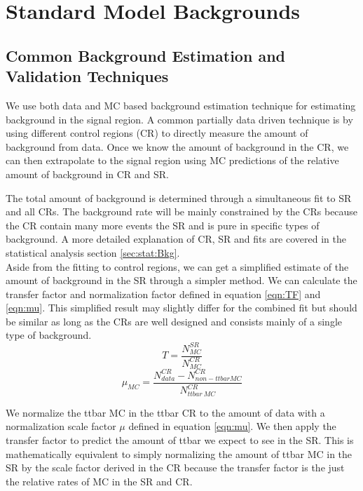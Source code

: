 \chapter{Standard Model Backgrounds}
\label{chap:backgrounds}

\section{Common Background Estimation and Validation Techniques}
\label{sec:Bkg:Tech}

\indent We use both data and MC based background estimation technique for estimating background in the signal region.  A common partially data driven technique is by using different control regions (CR) to directly measure the amount of background from data.  Once we know the amount of background in the CR, we can then extrapolate to the signal region using MC predictions of the relative amount of background in CR and SR. 

\indent The total amount of background is determined through a simultaneous fit to SR and all CRs.  The background rate will be mainly constrained by the CRs because the CR contain many more events the SR and is pure in specific types of background.  A more detailed explanation of CR, SR and fits are covered in the statistical analysis section \ref{sec:stat:Bkg}.  \\

\indent Aside from the fitting to control regions, we can get a simplified estimate of the amount of background in the SR through a simpler method.  We can calculate the transfer factor and normalization factor defined in equation \ref{eqn:TF} and \ref{eqn:mu}. This simplified result may slightly differ for the combined fit but should be similar as long as the CRs are well designed and consists mainly of a single type of background. \\

\begin{equation}
T = \frac{N_{MC}^{SR}}{N_{MC}^{CR}}
\label{eqn:TF}
\end{equation}
\begin{equation}
\mu_{MC} = \frac{N_{data}^{CR}-N_{non-ttbar MC}^{CR}}{N_{ttbar~MC}^{CR}}
\label{eqn:mu}
\end{equation}

\indent We normalize the ttbar MC in the ttbar CR to the amount of data with a normalization scale factor $\mu$ defined in equation \ref{eqn:mu}.  We then apply the transfer factor to predict the amount of ttbar we expect to see in the SR.  This is mathematically equivalent to simply normalizing the amount of ttbar MC in the SR by the scale factor derived in the CR because the transfer factor is the just the relative rates of MC in the SR and CR.   \\

